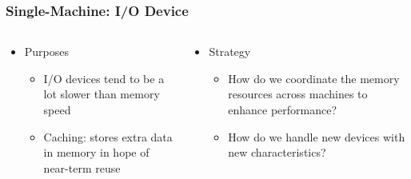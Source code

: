 \begin{frame}[plain,t]
	\frametitle{Single-Machine: I/O Device }
	\begin{columns}[t]
		\begin{column}{.5\textwidth}
			
			\begin{itemize}\Large
				\item Purposes
				\begin{itemize}\large
					\item I/O devices tend to be a
					lot slower than memory
					speed
					\item Caching: stores extra
					data in memory in hope
					of near-term reuse
					
				\end{itemize}
			\end{itemize}
			
		\end{column}\pause
		
		\begin{column}{.5\textwidth}
			
			\begin{itemize}\Large
				\item Strategy
				\begin{itemize}\large
					\item How do we coordinate
					the memory resources
					across machines to
					enhance performance?
					\item How do we handle new
					devices with new
					characteristics?
				\end{itemize}
			\end{itemize}
			
		\end{column}
	\end{columns}
\end{frame}
